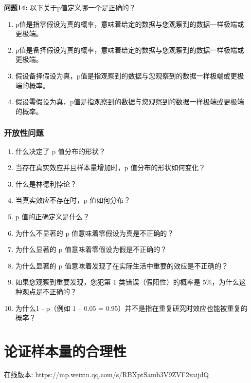 \documentclass[
  letterpaper,
  DIV=11,
  numbers=noendperiod]{scrreprt}
\providecommand{\tightlist}{%
  \setlength{\itemsep}{0pt}\setlength{\parskip}{0pt}}\usepackage{longtable,booktabs,array}
\begin{document}
\textbf{问题14:} 以下关于p值定义哪一个是正确的？

\begin{enumerate}
\def\labelenumi{\Alph{enumi})}
\tightlist
\item
  p值是指零假设为真的概率，意味着给定的数据与您观察到的数据一样极端或更极端。
\item
  p值是备择假设为真的概率，意味着给定的数据与您观察到的数据一样极端或更极端。
\item
  假设备择假设为真，p值是指观察到的数据与您观察到的数据一样极端或更极端的概率。
\item
  假设零假设为真，p值是指观察到的数据与您观察到的数据一样极端或更极端的概率。
\end{enumerate}

\hypertarget{ux5f00ux653eux6027ux95eeux9898}{%
\subsection{开放性问题}\label{ux5f00ux653eux6027ux95eeux9898}}

\begin{enumerate}
\def\labelenumi{\arabic{enumi}.}
\item
  什么决定了 p 值分布的形状？
\item
  当存在真实效应并且样本量增加时，p 值分布的形状如何变化？
\item
  什么是林德利悖论？
\item
  当真实效应不存在时，p 值如何分布？
\item
  p 值的正确定义是什么？
\item
  为什么不显著的 p 值意味着零假设为真是不正确的？
\item
  为什么显著的 p 值意味着零假设为假是不正确的？
\item
  为什么显著的 p 值意味着发现了在实际生活中重要的效应是不正确的？
\item
  如果您观察到重要发现，您犯第 1 类错误（假阳性）的概率是
  5\%，为什么这种观点是不正确的？
\item
  为什么1 - p（例如 1 -- 0.05 =
  0.95）并不是指在重复研究时效应也能被重复的概率？
\end{enumerate}


\hypertarget{sec-power}{%
\chapter{论证样本量的合理性}\label{sec-power}}

在线版本: https://mp.weixin.qq.com/s/RBXptSamb3V9ZVF2vaijdQ
\end{document}
